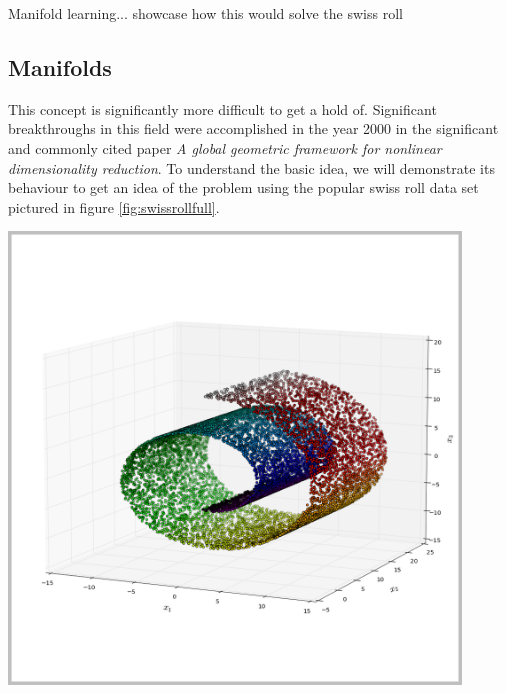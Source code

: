 Manifold learning... showcase how this would solve the swiss roll

\subsection{Manifolds} 

This concept is significantly more difficult to get a hold of.
Significant breakthroughs \cite{ma2012manifold} in this field were accomplished in the year 2000 in the significant and commonly cited paper \emph{A global geometric framework for nonlinear dimensionality reduction}. \cite{tenenbaum2000global}
To understand the basic idea, we will demonstrate its behaviour to get an idea of the problem using the popular swiss roll data set pictured in figure \ref{fig:swissrollfull}.


\noindent
\begin{minipage}[c]{0.4\linewidth}
%
\vspace*{6mm}
\begin{center}
	\includegraphics[width=0.9\textwidth]{external_content/graphs/swiss_roll.png}
	\captionsetup{justification=centering,type=htypei}
	\label{fig:swissrollfull}
\end{center}
%
\end{minipage}\hfill%
